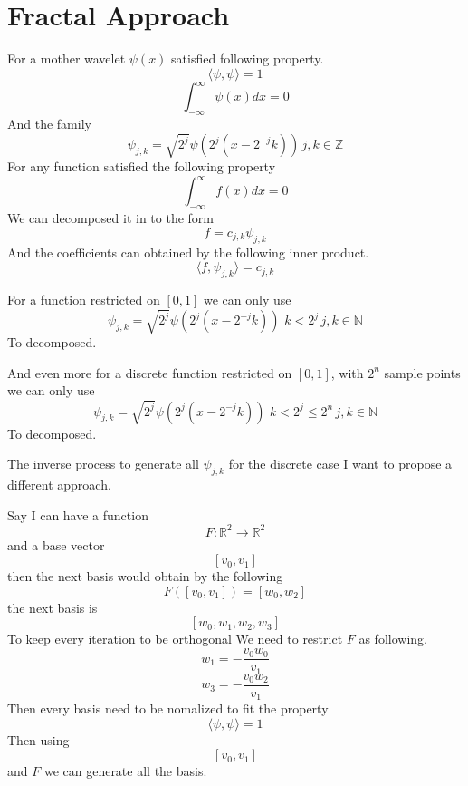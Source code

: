 \documentclass{article}
\theoremstyle{definition} %
\begin{document}


\section{Fractal Approach}
For a mother wavelet \(\psi(x)\) satisfied
following property.
\[
    \langle\psi,\psi\rangle=1
\]
\[
    \int_{-\infty}^{\infty}\psi(x)dx=0
\]
And the family
\[
    \psi_{j,k}=\sqrt{2^j}\psi(2^j(x-2^{-j}k)) \, j,k\in \mathbb{Z}
\]
For any function satisfied
the following property
\[
    \int_{-\infty}^{\infty}f(x)dx=0
\]
We can decomposed it in to the form
\[
    f=c_{j,k}\psi_{j,k}
\]
And the coefficients can obtained by
the following inner product.
\[
    \langle f,\psi_{j,k}\rangle=c_{j,k}
\]

For a function restricted on
\([0,1]\) we can only use
\[
    \psi_{j,k}=\sqrt{2^j}\psi(2^j(x-2^{-j}k)) \,
    \, k<2^j \, j,k\in \mathbb{N}
\]
To decomposed.

And even more for a discrete function restricted on
\([0,1]\), with \(2^n\) sample points we can only use
\[
    \psi_{j,k}=\sqrt{2^j}\psi(2^j(x-2^{-j}k)) \,
    \, k<2^j\leq2^n \, j,k\in \mathbb{N}
\]
To decomposed.

The inverse process to generate all \(\psi_{j,k}\)
for the discrete case I want to propose a different
approach.

Say I can have a function
\[
    F:\mathbb{R}^2\to\mathbb{R}^2
\]
and a base vector
\[
    [v_0,v_1]
\]
then the next basis would obtain by
the following
\[
    F([v_0,v_1])=[w_0,w_2]
\]
the next basis is
\[
    [w_0,w_1,w_2,w_3]
\]
To keep every iteration to be orthogonal
We need to restrict \(F\)
as following.
\[
    w_1=-\frac{v_0w_0}{v_1}
\]
\[
    w_3=-\frac{v_0w_2}{v_1}
\]
Then every basis need to be nomalized
to fit the property
\[
    \langle\psi,\psi\rangle=1
\]
Then using
\[
    [v_0,v_1]
\]
and \(F\)
we can generate all the basis.
\end{document}
